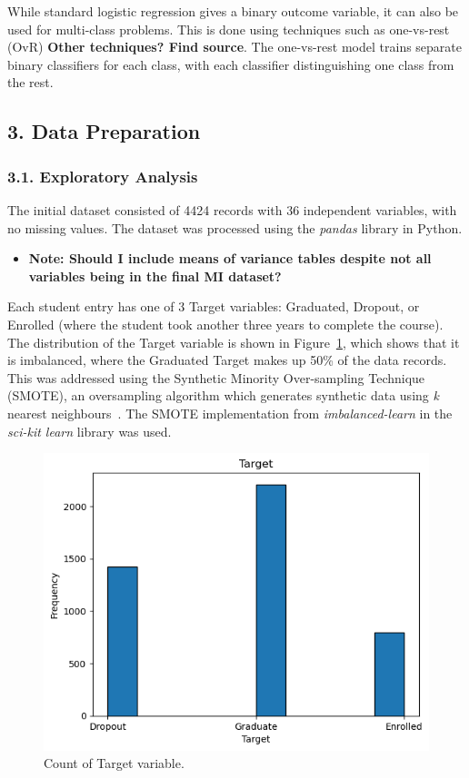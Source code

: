 \documentclass[12pt]{article}
\begin{document}
While standard logistic regression gives a binary outcome variable, it can also be used for multi-class problems. This is done using techniques such as one-vs-rest (OvR) \textbf{Other techniques? Find source}. The one-vs-rest model trains separate binary classifiers for each class, with each classifier distinguishing one class from the rest. 

\newpage
\subsection*{3. Data Preparation}
\subsubsection*{3.1. Exploratory Analysis}
The initial dataset consisted of 4424 records with 36 independent variables, with no missing values. The dataset was processed using the \textit{pandas} library in Python.

\begin{itemize}
    \item{\textbf{Note: Should I include means of variance tables despite not all variables being in the final MI dataset?}}
\end{itemize}

Each student entry has one of 3 Target variables: Graduated, Dropout, or Enrolled (where the student took another three years to complete the course). The distribution of the Target variable is shown in Figure~\ref{fig:target}, which shows that it is imbalanced, where the Graduated Target makes up 50\% of the data records. This was addressed using the Synthetic Minority Over-sampling Technique (SMOTE), an oversampling algorithm which generates synthetic data using \textit{k} nearest neighbours~\cite{smote}. The SMOTE implementation from \textit{imbalanced-learn} in the \textit{sci-kit learn} library was used.

\begin{figure} [H]
    \centering
    \includegraphics[width=0.8\linewidth]{target_plot}
    \caption{Count of Target variable.}\label{fig:target}
  \end{figure}  
\end{document}

